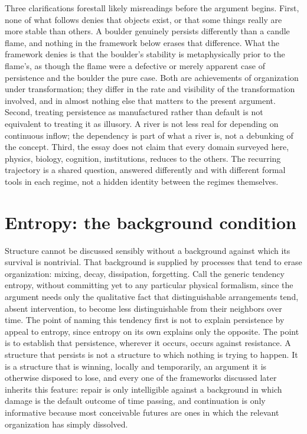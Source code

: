 \documentclass[11pt]{article}
\begin{document}
Three clarifications forestall likely misreadings before the argument begins. First, none of what follows denies that objects exist, or that some things really are more stable than others. A boulder genuinely persists differently than a candle flame, and nothing in the framework below erases that difference. What the framework denies is that the boulder's stability is metaphysically prior to the flame's, as though the flame were a defective or merely apparent case of persistence and the boulder the pure case. Both are achievements of organization under transformation; they differ in the rate and visibility of the transformation involved, and in almost nothing else that matters to the present argument. Second, treating persistence as manufactured rather than default is not equivalent to treating it as illusory. A river is not less real for depending on continuous inflow; the dependency is part of what a river is, not a debunking of the concept. Third, the essay does not claim that every domain surveyed here, physics, biology, cognition, institutions, reduces to the others. The recurring trajectory is a shared question, answered differently and with different formal tools in each regime, not a hidden identity between the regimes themselves.

\section{Entropy: the background condition}

Structure cannot be discussed sensibly without a background against which its survival is nontrivial. That background is supplied by processes that tend to erase organization: mixing, decay, dissipation, forgetting. Call the generic tendency entropy, without committing yet to any particular physical formalism, since the argument needs only the qualitative fact that distinguishable arrangements tend, absent intervention, to become less distinguishable from their neighbors over time. The point of naming this tendency first is not to explain persistence by appeal to entropy, since entropy on its own explains only the opposite. The point is to establish that persistence, wherever it occurs, occurs against resistance. A structure that persists is not a structure to which nothing is trying to happen. It is a structure that is winning, locally and temporarily, an argument it is otherwise disposed to lose, and every one of the frameworks discussed later inherits this feature: repair is only intelligible against a background in which damage is the default outcome of time passing, and continuation is only informative because most conceivable futures are ones in which the relevant organization has simply dissolved.
\end{document}
